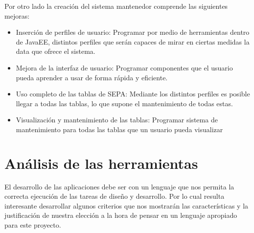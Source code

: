 \documentclass[a4paper,12pt,openany,oneside]{book}
\begin{document}
Por otro lado la creación del sistema mantenedor comprende las siguientes mejoras:

\begin{itemize}
	\item Inserción de perfiles de usuario: Programar por medio de herramientas dentro de JavaEE, distintos perfiles que serán capaces de mirar en ciertas medidas la data que ofrece el sistema.
	\item Mejora de la interfaz de usuario: Programar componentes que el usuario pueda aprender a usar de forma rápida y eficiente.
	\item Uso completo de las tablas de SEPA: Mediante los distintos perfiles es posible llegar a todas las tablas, lo que supone el mantenimiento de todas estas.
	\item Visualización y mantenimiento de las tablas: Programar sistema de mantenimiento para todas las tablas que un usuario pueda visualizar
\end{itemize}

\section{Análisis de las herramientas}
El desarrollo de las aplicaciones debe ser con un lenguaje que nos permita la correcta ejecución de las tareas de diseño y desarrollo. Por lo cual resulta interesante desarrollar algunos criterios que nos mostrarán las características y la justificación de nuestra elección a la hora de pensar en un lenguaje apropiado para este proyecto.
\end{document}
